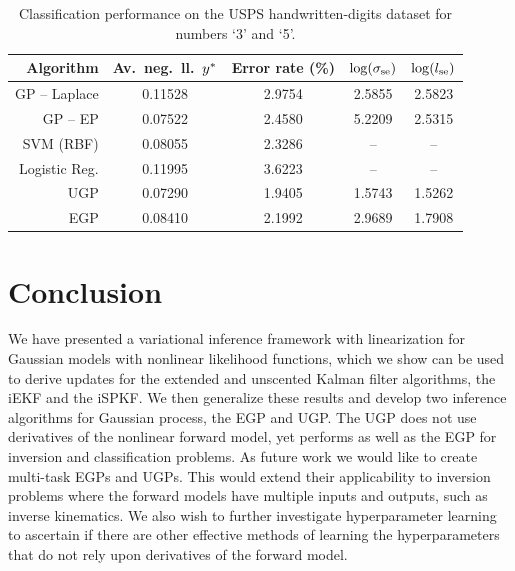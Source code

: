 \documentclass{article} %
\begin{document}
\begin{table}[tb]
    \centering
    \small
    \caption[]{Classification performance on the USPS handwritten-digits
        dataset for numbers `3' and `5'.}
    \begin{tabular}{r| c c c c}
        Algorithm & Av.\ neg.\ ll.\ $y^{*}$ & Error rate (\%) 
            & $\log\!\left({\sigma_\text{se}}\right)$ & $\log\!\left({l_\text{se}}\right)$ \\
        \toprule
        GP -- Laplace & 0.11528 & 2.9754 & 2.5855 & 2.5823 \\
        GP -- EP & 0.07522 & 2.4580 & 5.2209 & 2.5315 \\
        SVM (RBF) & 0.08055 & 2.3286 & -- & -- \\
        Logistic Reg. & 0.11995 & 3.6223 & -- & -- \\
        \midrule
        UGP & 0.07290 & 1.9405 & 1.5743 & 1.5262 \\
        EGP & 0.08410 & 2.1992 & 2.9689 & 1.7908 \\
        \bottomrule
    \end{tabular}
    \label{tab:class}
\end{table}


\section{Conclusion}

We have presented a variational inference framework with linearization for
Gaussian models with nonlinear likelihood functions, which we show can be used
to derive updates for the extended and unscented Kalman filter algorithms,
the iEKF and the iSPKF. 
We then generalize these results and develop two
inference algorithms for Gaussian process, the EGP and UGP. 
The UGP does not use derivatives of the nonlinear
forward model, yet performs as well as the EGP for inversion and classification
problems.  As future work we would like to create multi-task EGPs and UGPs.
This would extend their applicability to inversion problems where the forward
models have multiple inputs and outputs, such as inverse kinematics. We also
wish to further investigate hyperparameter learning to ascertain if there are
other effective methods of learning the hyperparameters that do not rely upon
derivatives of the forward model. 


 





\end{document}
